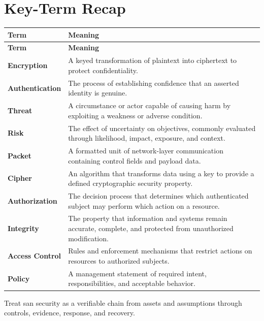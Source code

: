 \documentclass[11pt]{article}
\begin{document}
\section*{Key-Term Recap}
\begin{longtable}{>{\RaggedRight\arraybackslash}p{}>{\RaggedRight\arraybackslash}p{}}
\toprule\rowcolor{Navy}\color{white}\textbf{Term} & \color{white}\textbf{Meaning}\\\midrule
\endfirsthead
\toprule\rowcolor{Navy}\color{white}\textbf{Term} & \color{white}\textbf{Meaning}\\\midrule
\endhead
\textbf{Encryption} & A keyed transformation of plaintext into ciphertext to protect confidentiality. \\\midrule
\textbf{Authentication} & The process of establishing confidence that an asserted identity is genuine. \\\midrule
\textbf{Threat} & A circumstance or actor capable of causing harm by exploiting a weakness or adverse condition. \\\midrule
\textbf{Risk} & The effect of uncertainty on objectives, commonly evaluated through likelihood, impact, exposure, and context. \\\midrule
\textbf{Packet} & A formatted unit of network-layer communication containing control fields and payload data. \\\midrule
\textbf{Cipher} & An algorithm that transforms data using a key to provide a defined cryptographic security property. \\\midrule
\textbf{Authorization} & The decision process that determines which authenticated subject may perform which action on a resource. \\\midrule
\textbf{Integrity} & The property that information and systems remain accurate, complete, and protected from unauthorized modification. \\\midrule
\textbf{Access Control} & Rules and enforcement mechanisms that restrict actions on resources to authorized subjects. \\\midrule
\textbf{Policy} & A management statement of required intent, responsibilities, and acceptable behavior. \\\midrule
\bottomrule
\end{longtable}
\begin{takeawaybox}
Treat san security as a verifiable chain from assets and assumptions through controls, evidence, response, and recovery.
\end{takeawaybox}
\end{document}
